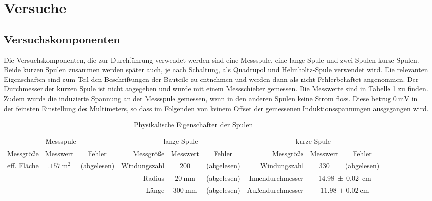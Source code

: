 \section{Versuche}
\subsection{Versuchskomponenten}
Die Versuchskomponenten, die zur Durchführung verwendet werden sind eine Messspule, eine lange Spule und zwei Spulen kurze Spulen. Beide kurzen Spulen zusammen werden später auch, je nach Schaltung, als Quadrupol und Helmholtz-Spule verwendet wird. Die relevanten Eigenschaften sind zum Teil den Beschriftungen der Bauteile zu entnehmen und werden dann als nicht Fehlerbehaftet angenommen. Der Durchmesser der kurzen Spule ist nicht angegeben und wurde mit einem Messschieber gemessen. Die Messwerte sind in Tabelle \ref{tab:eigenschaftenSpulen} zu finden. Zudem wurde die induzierte Spannung an der Messspule gemessen, wenn in den anderen Spulen keine Strom floss. Diese betrug $ \SI{0}{\milli\volt} $ in der feinsten Einstellung des Multimeters, so dass im Folgenden von keinem Offset der gemessenen Induktionsspannungen ausgegangen wird.
\begin{landscape}
\begin{table}
\thispagestyle{plain}
\begin{tabular}{r|cc||r|cc||r|cc}
	\multicolumn{3}{c}{Messspule} & \multicolumn{3}{c}{lange Spule} & \multicolumn{3}{c}{kurze Spule} \\
	Messgröße & Messwert & Fehler & Messgröße & Messwert & Fehler & Messgröße & Messwert & Fehler \\ \hline
	eff. Fläche & $ \SI{.157}{\square\meter} $ & (abgelesen) & Windungszahl & $ 200 $ & (abgelesen) & Windungszahl & 330 & (abgelesen) \\
	& & & Radius & $ \SI{20}{\milli\meter} $ & (abgelesen) & Innendurchmesser & \multicolumn{2}{c}{\SI{14.98(2)}{\centi\meter}} \\
	& & & Länge & $ \SI{300}{\milli\meter} $ & (abgelesen) & Außendurchmesser & \multicolumn{2}{c}{$ \SI{11.98(2)}{\centi\meter} $}	
\end{tabular}
\caption{Physikalische Eigenschaften der Spulen}
\label{tab:eigenschaftenSpulen}
\end{table}
\end{landscape}

